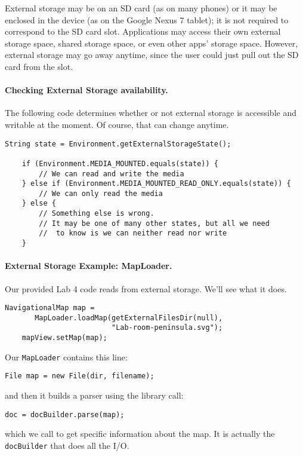 External storage may be on an SD card (as on many phones) or it may be
enclosed in the device (as on the Google Nexus 7 tablet); it is not
required to correspond to the SD card slot. Applications may access
their own external storage space, shared storage space, or even other
apps' storage space. However, external storage may go away anytime, since
the user could just pull out the SD card from the slot.

\paragraph{Checking External Storage availability.} The following
code determines whether or not external storage is accessible and
writable at the moment. Of course, that can change anytime.
\begin{lstlisting}[basicstyle=\scriptsize]
    String state = Environment.getExternalStorageState();

    if (Environment.MEDIA_MOUNTED.equals(state)) {
        // We can read and write the media
    } else if (Environment.MEDIA_MOUNTED_READ_ONLY.equals(state)) {
        // We can only read the media
    } else {
        // Something else is wrong. 
        // It may be one of many other states, but all we need
        //  to know is we can neither read nor write
    }
\end{lstlisting}

\paragraph{External Storage Example: MapLoader.} Our provided 
Lab 4 code reads from external storage. We'll see what it does.
\begin{lstlisting}[basicstyle=\scriptsize]
    NavigationalMap map = 
       MapLoader.loadMap(getExternalFilesDir(null), 
                         "Lab-room-peninsula.svg");
    mapView.setMap(map);
\end{lstlisting}

Our {\tt MapLoader} contains this line:
\begin{lstlisting}[basicstyle=\scriptsize]
  File map = new File(dir, filename);
\end{lstlisting} 
and then it builds a parser using the library call:
\begin{lstlisting}[basicstyle=\scriptsize]
  doc = docBuilder.parse(map);
\end{lstlisting}
which we call to get specific information about the map. It is
actually the {\tt docBuilder} that does all the I/O.

